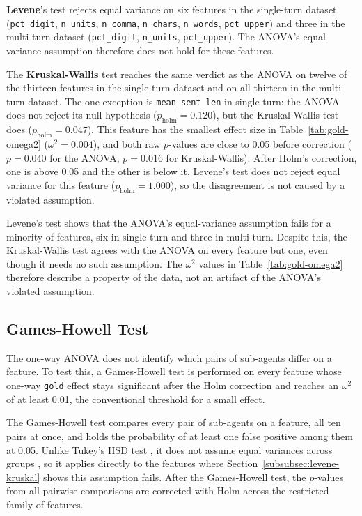 \textbf{Levene}'s test rejects equal variance on six features in the single-turn dataset (\texttt{pct\_digit}, \texttt{n\_units}, \texttt{n\_comma}, \texttt{n\_chars}, \texttt{n\_words}, \texttt{pct\_upper}) and three in the multi-turn dataset (\texttt{pct\_digit}, \texttt{n\_units}, \texttt{pct\_upper}). The ANOVA's equal-variance assumption therefore does not hold for these features.

The \textbf{Kruskal-Wallis} test reaches the same verdict as the ANOVA on twelve of the thirteen features in the single-turn dataset and on all thirteen in the multi-turn dataset. The one exception is \texttt{mean\_sent\_len} in single-turn: the ANOVA does not reject its null hypothesis ($p_{\text{holm}} = 0.120$), but the Kruskal-Wallis test does ($p_{\text{holm}} = 0.047$). This feature has the smallest effect size in Table~\ref{tab:gold-omega2} ($\omega^2 = 0.004$), and both raw $p$-values are close to 0.05 before correction ($p = 0.040$ for the ANOVA, $p = 0.016$ for Kruskal-Wallis). After Holm's correction, one is above 0.05 and the other is below it. Levene's test does not reject equal variance for this feature ($p_{\text{holm}} = 1.000$), so the disagreement is not caused by a violated assumption.

Levene's test shows that the ANOVA's equal-variance assumption fails for a minority of features, six in single-turn and three in multi-turn. Despite this, the Kruskal-Wallis test agrees with the ANOVA on every feature but one, even though it needs no such assumption. The $\omega^2$ values in Table~\ref{tab:gold-omega2} therefore describe a property of the data, not an artifact of the ANOVA's violated assumption.

\subsection{Games-Howell Test}
\label{subsec:anova-posthoc}

The one-way ANOVA does not identify which pairs of sub-agents differ on a feature. To test this, a Games-Howell test is performed on every feature whose one-way \texttt{gold} effect stays significant after the Holm correction and reaches an $\omega^2$ of at least 0.01, the conventional threshold for a small effect.

The Games-Howell test compares every pair of sub-agents on a feature, all ten pairs at once, and holds the probability of at least one false positive among them at 0.05. Unlike Tukey's HSD test \citep{montgomeryDesignAnalysisExperiments2022}, it does not assume equal variances across groups \citep{gamesPairwiseMultipleComparison1976}, so it applies directly to the features where Section~\ref{subsubsec:levene-kruskal} shows this assumption fails.
After the Games-Howell test, the $p$-values from all pairwise comparisons are corrected with Holm across the restricted family of features.

